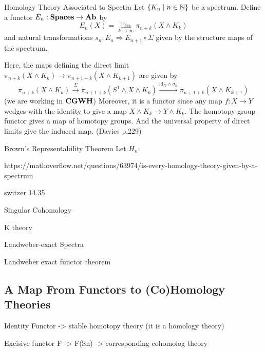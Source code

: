 \documentclass[a4paper]{article}
\begin{document}
\begin{defn}{Homology Theory Associated to Spectra}{} Let $\{K_n\;|\;n\in\mathbb{N}\}$ be a spectrum. Define a functor $E_n:\bold{Spaces}\to\bold{Ab}$ by $$E_n(X)=\lim_{k\to\infty}\pi_{n+k}(X\wedge K_k)$$ and natural transformations $s_n:E_n\Rightarrow E_{n+1}\circ\Sigma$ given by the structure maps of the spectrum. 
\end{defn}

Here, the maps defining the direct limit $\pi_{n+k}(X\wedge K_k)\to\pi_{n+1+k}(X\wedge K_{k+1})$ are given by $$\pi_{n+k}(X\wedge K_k)\overset{\Sigma}{\rightarrow}\pi_{n+1+k}(S^1\wedge X\wedge K_k)\overset{\text{id}_X\wedge\sigma_n}{\rightarrow}\pi_{n+1+k}(X\wedge K_{k+1})$$ (we are working in $\bold{CGWH}$) Moreover, it is a functor since any map $f:X\to Y$ wedges with the identity to give a map $X\wedge K_k\to Y\wedge K_k$. The homotopy group functor gives a map of homotopy groups. And the universal property of direct limits give the induced map. (Davies p.229)

\begin{thm}{Brown's Representability Theorem}{} Let $H_n:$
\end{thm}

https://mathoverflow.net/questions/63974/is-every-homology-theory-given-by-a-spectrum

switzer 14.35

\begin{eg}{Singular Cohomology}{}
\end{eg}

\begin{eg}{K theory}{}
\end{eg}

\begin{eg}{Landweber-exact Spectra}{}
\end{eg}

\begin{thm}{Landweber exact functor theorem}{}
\end{thm}

\subsection{A Map From Functors to (Co)Homology Theories}
\begin{eg}{}{} Identity Functor -> stable homotopy theory (it is a homology theory)
\end{eg}

\begin{eg}{}{} Excisive functor F -> {F(Sn)} -> corresponding cohomolog theory
\end{eg}
\end{document}
